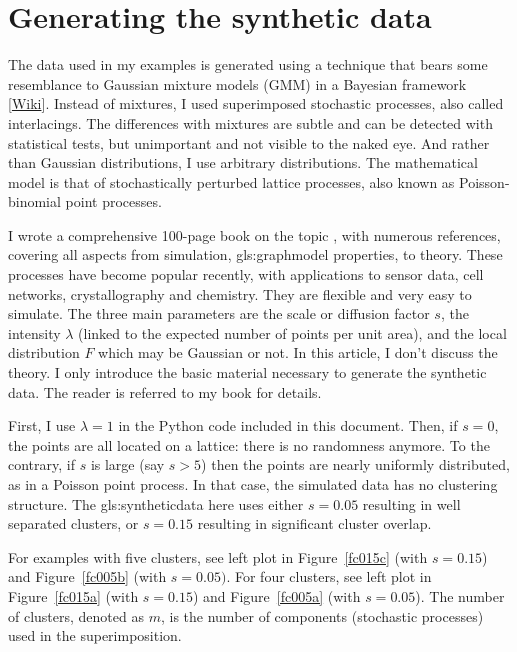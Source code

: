 \documentclass[oneside,10pt]{book}
\begin{document}

\section{Generating the synthetic data}

The data used in my examples is generated using a technique that bears some resemblance to
\textcolor{index}{Gaussian mixture models} (GMM)
 in a Bayesian framework [\href{https://en.wikipedia.org/wiki/Mixture_model}{Wiki}]. Instead of mixtures, I used superimposed stochastic processes, also called interlacings. The differences with mixtures are subtle and can be detected with statistical tests, but unimportant and not visible to the naked eye. And
rather than Gaussian distributions, I use arbitrary distributions. The mathematical model is that of
stochastically perturbed lattice processes, also known as Poisson-binomial point processes.

I wrote a comprehensive 100-page book on the topic \cite{vgsimulnew}, with numerous references, covering all aspects from simulation, \gls{gls:graphmodel} properties, to theory. These processes have become popular recently, with applications to sensor data, cell networks, crystallography and chemistry. They are flexible and very easy to simulate. The three main parameters are the scale or diffusion factor $s$, the intensity $\lambda$ (linked to the expected number of points per unit area), and the local distribution $F$ which may be Gaussian or not. In this article, I don't discuss the theory.  I only introduce the basic material necessary to generate the synthetic data. The reader is referred to my book \cite{vgsimulnew} for details.

First, I use $\lambda=1$ in the Python code included in this document. Then, if $s=0$, the points are all located on a lattice: there is no randomness anymore. To the contrary, if $s$ is large (say $s>5$) then the points are nearly uniformly distributed, as in a Poisson point process. In that case, the simulated data has no clustering structure. The \gls{gls:syntheticdata} here uses either $s=0.05$ resulting in well separated clusters,
or $s=0.15$ resulting in significant cluster overlap.

For examples with five clusters, see left plot
in Figure~\ref{fc015c} (with $s=0.15$) and Figure~\ref{fc005b} (with $s=0.05)$. For four clusters, see left plot in Figure~\ref{fc015a} (with $s=0.15$) and Figure~\ref{fc005a}
(with $s=0.05$).  The number of clusters, denoted as $m$, is the number of components (stochastic processes) used in the superimposition.
\end{document}
